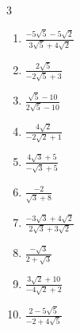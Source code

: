 \begin{multicols}{3}
\begin{enumerate}

  \item $\displaystyle \frac{-5\sqrt{5}-5\sqrt{2}}{3\sqrt{5}+4\sqrt{2}}$


  \item $\displaystyle \frac{2\sqrt{5}}{-2\sqrt{5}+3}$


  \item $\displaystyle \frac{\sqrt{5}-10}{2\sqrt{5}-10}$


  \item $\displaystyle \frac{4\sqrt{2}}{-2\sqrt{2}+1}$


\columnbreak %

  \item $\displaystyle \frac{4\sqrt{3}+5}{-\sqrt{3}+5}$


  \item $\displaystyle \frac{-2}{\sqrt{3}+8}$


  \item $\displaystyle \frac{-3\sqrt{3}+4\sqrt{2}}{2\sqrt{3}+3\sqrt{2}}$


  \item $\displaystyle \frac{-\sqrt{3}}{2+\sqrt{3}}$


  \item $\displaystyle \frac{3\sqrt{2}+10}{-4\sqrt{2}+2}$


\columnbreak %

\resetques

  \item $\displaystyle \frac{2-5\sqrt{5}}{-2+4\sqrt{5}}$



\end{enumerate}
\end{multicols}
